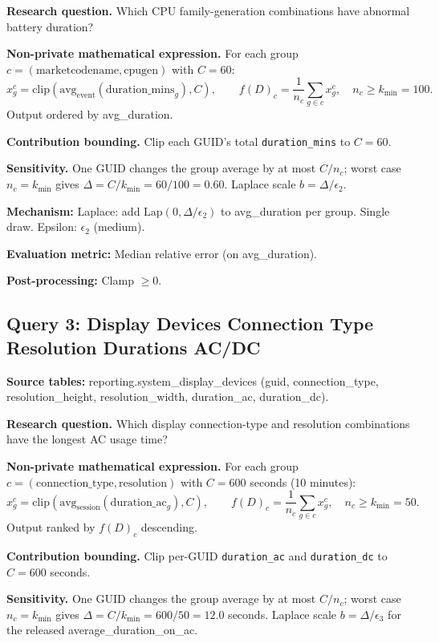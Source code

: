 \documentclass[12pt,letterpaper]{article}
\begin{document}
\textbf{Research question.} Which CPU family-generation combinations have abnormal battery duration?

\textbf{Non-private mathematical expression.} For each group $c = (\text{marketcodename}, \text{cpugen})$ with $C = 60$:
\[
x_g^c = \text{clip}(\text{avg}_{\text{event}}(\text{duration\_mins}_g), C), \qquad
f(D)_c = \frac{1}{n_c} \sum_{g \in c} x_g^c, \quad n_c \geq k_{\min} = 100.
\]
Output ordered by avg\_duration.

\textbf{Contribution bounding.} Clip each GUID's total \texttt{duration\_mins} to $C = 60$.

\textbf{Sensitivity.} One GUID changes the group average by at most $C/n_c$; worst case $n_c = k_{\min}$ gives $\Delta = C/k_{\min} = 60/100 = 0.60$. Laplace scale $b = \Delta/\epsilon_2$.

\textbf{Mechanism:} Laplace: add $\text{Lap}(0, \Delta/\epsilon_2)$ to avg\_duration per group. Single draw. Epsilon: $\epsilon_2$ (medium).

\textbf{Evaluation metric:} Median relative error (on avg\_duration).

\textbf{Post-processing:} Clamp $\geq 0$.

\subsection{Query 3: Display Devices Connection Type Resolution Durations AC/DC}
\label{sec:q3}

\textbf{Source tables:} reporting.system\_display\_devices (guid, connection\_type, resolution\_height, resolution\_width, duration\_ac, duration\_dc).

\textbf{Research question.} Which display connection-type and resolution combinations have the longest AC usage time?

\textbf{Non-private mathematical expression.} For each group $c = (\text{connection\_type}, \text{resolution})$ with $C = 600$ seconds (10 minutes):
\[
x_g^c = \text{clip}(\text{avg}_{\text{session}}(\text{duration\_ac}_g), C), \qquad
f(D)_c = \frac{1}{n_c} \sum_{g \in c} x_g^c, \quad n_c \geq k_{\min} = 50.
\]
Output ranked by $f(D)_c$ descending.

\textbf{Contribution bounding.} Clip per-GUID \texttt{duration\_ac} and \texttt{duration\_dc} to $C = 600$ seconds.

\textbf{Sensitivity.} One GUID changes the group average by at most $C/n_c$; worst case $n_c = k_{\min}$ gives $\Delta = C/k_{\min} = 600/50 = 12.0$ seconds. Laplace scale $b = \Delta/\epsilon_3$ for the released average\_duration\_on\_ac.
\end{document}
